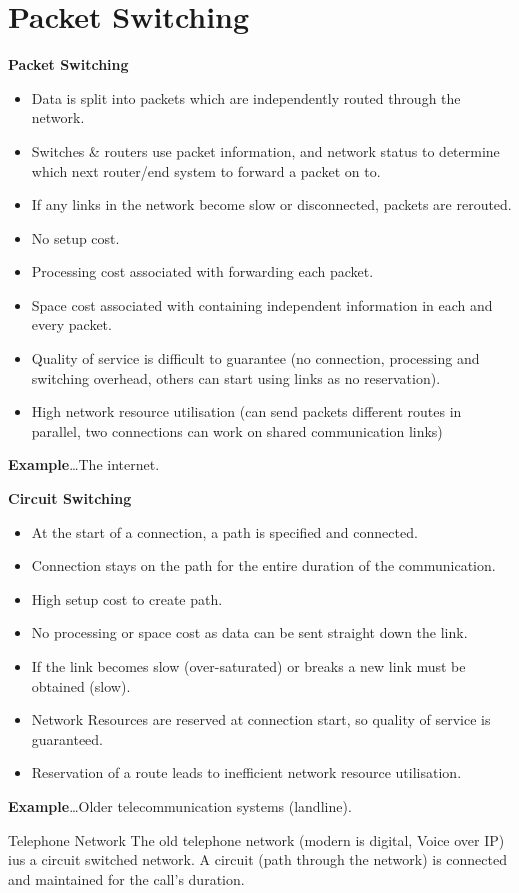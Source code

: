 \section{Packet Switching}
\begin{minipage}[t]{0.48\textwidth}
    \centerline{\textbf{Packet Switching}}
    \begin{itemize}
        \setlength\itemsep{0em}
        \item Data is split into packets which are independently routed through the network.
        \item Switches \& routers use packet information, and network status to determine which next router/end system to forward a packet on to.
        \item If any links in the network become slow or disconnected, packets are rerouted.
        \item No setup cost.
        \item Processing cost associated with forwarding each packet.
        \item Space cost associated with containing independent information in each and every packet.
        \item Quality of service is difficult to guarantee (no connection, processing and switching overhead, others can start using links as no reservation).
        \item High network resource utilisation (can send packets different routes in parallel, two connections can work on shared communication links)
    \end{itemize}
    \textbf{Example}\dots The internet.
\end{minipage}
\hfill
\begin{minipage}[t]{0.48\textwidth}
    \centerline{\textbf{Circuit Switching}}
    \begin{itemize}
        \setlength\itemsep{0em}
        \item At the start of a connection, a path is specified and connected.
        \item Connection stays on the path for the entire duration of the communication.
        \item High setup cost to create path.
        \item No processing or space cost as data can be sent straight down the link.
        \item If the link becomes slow (over-saturated) or breaks a new link must be obtained (slow).
        \item Network Resources are reserved at connection start, so quality of service is guaranteed.
        \item Reservation of a route leads to inefficient network resource utilisation.
    \end{itemize}
    \textbf{Example}\dots Older telecommunication systems (landline).
\end{minipage}
\begin{sidenotebox}{Telephone Network}
    The old telephone network (modern is digital, Voice over IP) ius a circuit switched network. A circuit (path through the network) is connected and maintained for the call's duration.
\end{sidenotebox}

